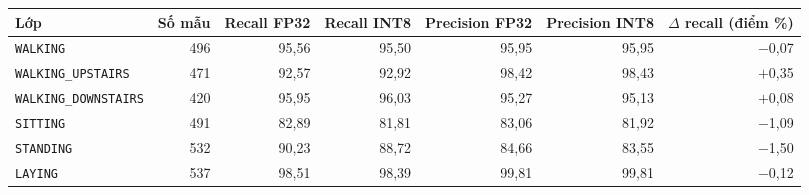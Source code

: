 \begin{tabular}{lrrrrrr}
\toprule
Lớp & Số mẫu & Recall FP32 & Recall INT8 & Precision FP32 & Precision INT8 & $\Delta$ recall (điểm \%) \\
\midrule
\texttt{WALKING} & 496 & 95,56 & 95,50 & 95,95 & 95,95 & $-$0,07 \\
\texttt{WALKING\_UPSTAIRS} & 471 & 92,57 & 92,92 & 98,42 & 98,43 & $+$0,35 \\
\texttt{WALKING\_DOWNSTAIRS} & 420 & 95,95 & 96,03 & 95,27 & 95,13 & $+$0,08 \\
\texttt{SITTING} & 491 & 82,89 & 81,81 & 83,06 & 81,92 & $-$1,09 \\
\texttt{STANDING} & 532 & 90,23 & 88,72 & 84,66 & 83,55 & $-$1,50 \\
\texttt{LAYING} & 537 & 98,51 & 98,39 & 99,81 & 99,81 & $-$0,12 \\
\bottomrule
\end{tabular}

